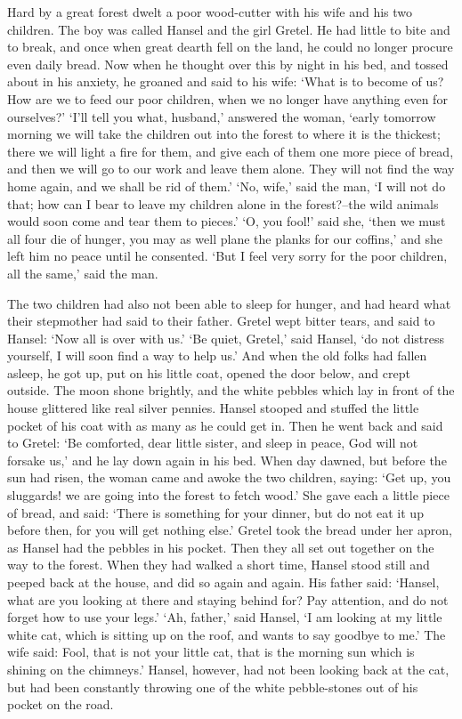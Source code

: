 \documentclass[oneside,11pt]{book} %
\begin{document}
Hard by a great forest dwelt a poor wood-cutter with his wife and his two children. The boy was called Hansel and the girl Gretel. He had little to bite and to break, and once when great dearth fell on the land, he could no longer procure even daily bread. Now when he thought over this by night in his bed, and tossed about in his anxiety, he groaned and said to his wife: `What is to become of us? How are we to feed our poor children, when we no longer have anything even for ourselves?' `I'll tell you what, husband,' answered the woman, `early tomorrow morning we will take the children out into the forest to where it is the thickest; there we will light a fire for them, and give each of them one more piece of bread, and then we will go to our work and leave them alone. They will not find the way home again, and we shall be rid of them.' `No, wife,' said the man, `I will not do that; how can I bear to leave my children alone in the forest?--the wild animals would soon come and tear them to pieces.' `O, you fool!' said she, `then we must all four die of hunger, you may as well plane the planks for our coffins,' and she left him no peace until he consented. `But I feel very sorry for the poor children, all the same,' said the man.

The two children had also not been able to sleep for hunger, and had heard what their stepmother had said to their father. Gretel wept bitter tears, and said to Hansel: `Now all is over with us.' `Be quiet, Gretel,' said Hansel, `do not distress yourself, I will soon find a way to help us.' And when the old folks had fallen asleep, he got up, put on his little coat, opened the door below, and crept outside. The moon shone brightly, and the white pebbles which lay in front of the house glittered like real silver pennies. Hansel stooped and stuffed the little pocket of his coat with as many as he could get in. Then he went back and said to Gretel: `Be comforted, dear little sister, and sleep in peace, God will not forsake us,' and he lay down again in his bed. When day dawned, but before the sun had risen, the woman came and awoke the two children, saying: `Get up, you sluggards! we are going into the forest to fetch wood.' She gave each a little piece of bread, and said: `There is something for your dinner, but do not eat it up before then, for you will get nothing else.' Gretel took the bread under her apron, as Hansel had the pebbles in his pocket. Then they all set out together on the way to the forest. When they had walked a short time, Hansel stood still and peeped back at the house, and did so again and again. His father said: `Hansel, what are you looking at there and staying behind for? Pay attention, and do not forget how to use your legs.' `Ah, father,' said Hansel, `I am looking at my little white cat, which is sitting up on the roof, and wants to say goodbye to me.' The wife said: Fool, that is not your little cat, that is the morning sun which is shining on the chimneys.' Hansel, however, had not been looking back at the cat, but had been constantly throwing one of the white pebble-stones out of his pocket on the road.
\end{document}
